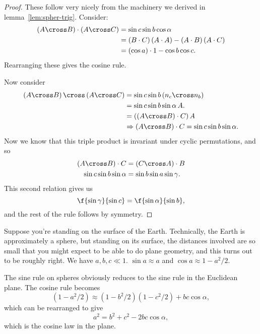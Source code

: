 \begin{proof}
	These follow very nicely from the machinery we derived in lemma~\ref{lem:spher-trig}. Consider:
	\begin{align*}
		\left( \AA\cross\BB \right) \cdot \left( \AA\cross\CC \right)
		&= \sin c \sin b \cos \alpha \\
		&= \left( \BB\cdot \CC \right)\left( \AA\cdot\AA \right) - \left( \AA\cdot\BB \right)\left( \AA\cdot\CC \right) \\ %
		&= \left( \cos a \right)\cdot 1 - \cos b \cos c.
	\end{align*}
	Rearranging these gives the cosine rule.
	
	Now consider
	\begin{align*}
		\left( \AA\cross\BB \right) \cross \left( \AA\cross\CC \right)
		&= \sin c \sin b \left( \nn_c \cross \nn_b \right) \\
		&= \sin c \sin b \sin \alpha\,\AA. \\
		&= \left( \left( \AA\cross\BB \right)\cdot \CC \right) \AA \\
		&\Rightarrow \left( \AA\cross\BB \right)\cdot\CC = \sin c \sin b \sin\alpha.
	\end{align*}
	Now we know that this triple product is invariant under cyclic permutations, and so
	\begin{align*}
		\left( \AA\cross\BB \right)\cdot \CC &= \left( \CC\cross\AA \right)\cdot\BB \\
		\sin c\sin b\sin\alpha &= \sin b\sin a\sin\gamma.
	\end{align*}
	This second relation gives us
	\begin{equation*}
		\f{\sin\gamma}{\sin c} = \f{\sin\alpha}{\sin b},
	\end{equation*}
	and the rest of the rule follows by symmetry.
\end{proof}

	\vspace{3pt}

\begin{note}
	Suppose you're standing on the surface of the Earth. Technically, the Earth is approximately a sphere, but standing on its surface, the distances involved are so small that you might expect to be able to do plane geometry, and this turns out to be roughly right. We have $a,b,c\ll 1$. $\sin a \approx a$ and $\cos a \approx 1-a^2/2$. %

	The sine rule on spheres obviously reduces to the sine rule in the Euclidean plane. The cosine rule becomes
	\begin{equation*}
		(1-a^2/2) \approx (1-b^2/2) (1-c^2/2) + bc \cos \alpha,
	\end{equation*}
	which can be rearranged to give
	\begin{equation*}
		a^2 = b^2 + c^2 - 2bc \cos\alpha,
	\end{equation*}
	which is the cosine law in the plane.
\end{note}

